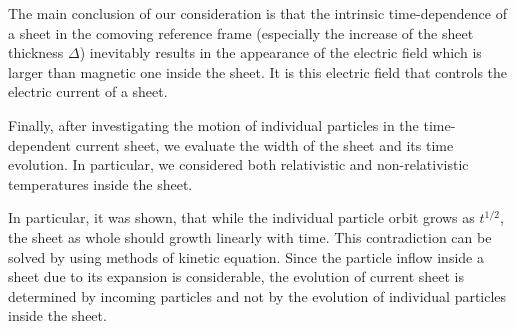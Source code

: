 \documentclass[useAMS,usenatbib]{mn2e}
\begin{document}
{ The main conclusion of our consideration is that the intrinsic time-dependence 
of a sheet in the comoving reference frame (especially the increase of the sheet thickness 
$\Delta$) inevitably results in the appearance of the electric field which is larger than
magnetic one inside the sheet. It is this electric field that controls the electric current
of a sheet.}

{ Finally, after investigating the motion of individual particles in the time-dependent 
current sheet, we { evaluate} the width of the sheet and its time evolution. In particular, 
we considered both relativistic and non-relativistic temperatures inside the sheet.} 

{ In particular, it was shown, that while the individual particle orbit grows as 
$t^{1/2}$, the sheet as whole should growth linearly with time. This contradiction 
can be solved by using methods of kinetic equation. Since the particle inflow inside 
a sheet due to its expansion is considerable, the evolution of current sheet is 
determined by incoming particles and not by the evolution of individual particles 
inside the sheet.}


\end{document}
